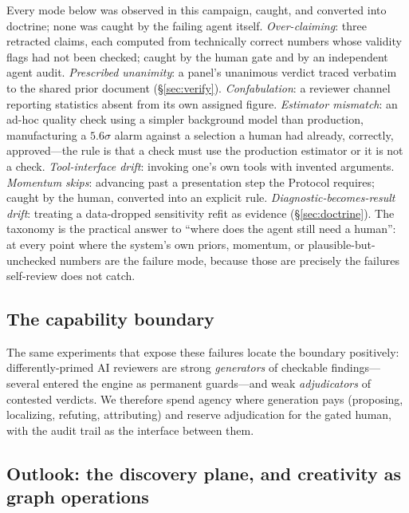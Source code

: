 \documentclass[twocolumn]{aastex631}
\begin{document}
Every mode below was observed in this campaign, caught, and converted into
doctrine; none was caught by the failing agent itself.
\emph{Over-claiming}: three retracted claims, each computed from technically
correct numbers whose validity flags had not been checked; caught by the
human gate and by an independent agent audit. \emph{Prescribed unanimity}:
a panel's unanimous verdict traced verbatim to the shared prior document
(\S\ref{sec:verify}). \emph{Confabulation}: a reviewer channel reporting
statistics absent from its own assigned figure. \emph{Estimator mismatch}:
an ad-hoc quality check using a simpler background model than production,
manufacturing a $5.6\sigma$ alarm against a selection a human had already,
correctly, approved---the rule is that a check must use the production
estimator or it is not a check. \emph{Tool-interface drift}: invoking one's
own tools with invented arguments. \emph{Momentum skips}: advancing past a
presentation step the Protocol requires; caught by the human, converted
into an explicit rule. \emph{Diagnostic-becomes-result drift}: treating a
data-dropped sensitivity refit as evidence (\S\ref{sec:doctrine}).
The taxonomy is the practical answer to ``where does the agent still need a
human'': at every point where the system's own priors, momentum, or
plausible-but-unchecked numbers are the failure mode, because those are
precisely the failures self-review does not catch.

\subsection{The capability boundary}

The same experiments that expose these failures locate the boundary
positively: differently-primed AI reviewers are strong \emph{generators} of
checkable findings---several entered the engine as permanent guards---and
weak \emph{adjudicators} of contested verdicts. We therefore spend agency
where generation pays (proposing, localizing, refuting, attributing) and
reserve adjudication for the gated human, with the audit trail as the
interface between them.

\subsection{Outlook: the discovery plane, and creativity as graph operations}
\label{sec:creativity}
\end{document}

